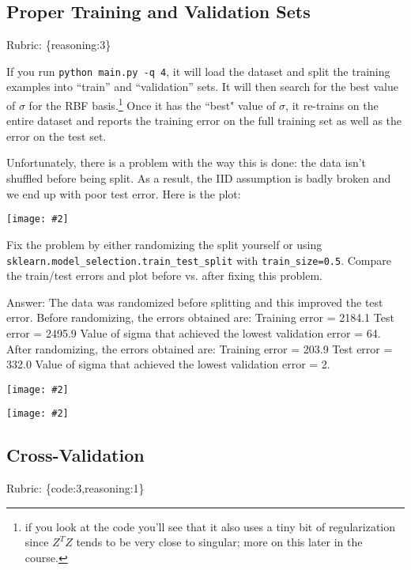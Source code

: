 \documentclass{article}
\def\rubric#1{\gre{Rubric: \{#1\}}}{}
\def\blu#1{{\color{blu}#1}}
\def\gre#1{{\color{gre}#1}}
\newcommand{\centerfig}[2]{\begin{center}\texttt{[image: \#2]}\end{center}}
\begin{document}
\subsection{Proper Training and Validation Sets}
\rubric{reasoning:3}

If you run \verb|python main.py -q 4|, it will load the dataset and split the training examples
 into ``train'' and ``validation'' sets. It will then search for the best value of $\sigma$
 for the RBF basis.\footnote{if you look at the code you'll see that it also uses a tiny bit of regularization since $Z^TZ$ tends to be very close to singular; more on this later in the course.}
  Once it has the ``best" value of $\sigma$, it re-trains on the entire dataset and reports the
  training error on the full training set as well as the error on the test set.

Unfortunately, there is a problem with the way this is done: the data isn't shuffled before being split.
As a result, the IID assumption is badly broken and we end up with poor test error. Here is the plot:

\centerfig{.7}{../figs/least_squares_rbf_bad.pdf}


\blu{Fix the problem by either randomizing the split yourself or using \texttt{sklearn.model\_selection.train\_test\_split} with \texttt{train\_size=0.5}. Compare the train/test errors and plot before vs. after fixing this problem.}

\blu{Answer:} The data was randomized before splitting and this improved the test error. 
\newline Before randomizing, the errors obtained are:
\newline Training error = 2184.1
\newline Test error     = 2495.9
\newline  Value of sigma that achieved the lowest validation error = 64. \\
\newline After randomizing, the errors obtained are:
\newline Training error = 203.9
\newline Test error     = 332.0
\newline Value of sigma that achieved the lowest validation error = 2. \\
\centerfig{.7}{../figs/least_squares_rbf_bad.pdf}
\centerfig{.7}{../figs/least_squares_rbf_randomization .pdf}


\subsection{Cross-Validation}
\rubric{code:3,reasoning:1}
\end{document}
